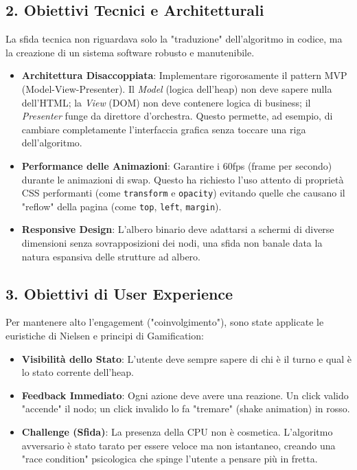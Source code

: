 \documentclass[openany]{theme/uniprthesis}
\begin{document}
\subsection{2. Obiettivi Tecnici e Architetturali}
La sfida tecnica non riguardava solo la "traduzione" dell'algoritmo in codice, ma la creazione di un sistema software robusto e manutenibile.
\begin{itemize}
    \item \textbf{Architettura Disaccoppiata}: Implementare rigorosamente il pattern MVP (Model-View-Presenter). Il \textit{Model} (logica dell'heap) non deve sapere nulla dell'HTML; la \textit{View} (DOM) non deve contenere logica di business; il \textit{Presenter} funge da direttore d'orchestra. Questo permette, ad esempio, di cambiare completamente l'interfaccia grafica senza toccare una riga dell'algoritmo.
    \item \textbf{Performance delle Animazioni}: Garantire i 60fps (frame per secondo) durante le animazioni di swap. Questo ha richiesto l'uso attento di proprietà CSS performanti (come \texttt{transform} e \texttt{opacity}) evitando quelle che causano il "reflow" della pagina (come \texttt{top}, \texttt{left}, \texttt{margin}).
    \item \textbf{Responsive Design}: L'albero binario deve adattarsi a schermi di diverse dimensioni senza sovrapposizioni dei nodi, una sfida non banale data la natura espansiva delle strutture ad albero.
\end{itemize}

\subsection{3. Obiettivi di User Experience}
Per mantenere alto l'engagement ("coinvolgimento"), sono state applicate le euristiche di Nielsen e principi di Gamification:
\begin{itemize}
    \item \textbf{Visibilità dello Stato}: L'utente deve sempre sapere di chi è il turno e qual è lo stato corrente dell'heap.
    \item \textbf{Feedback Immediato}: Ogni azione deve avere una reazione. Un click valido "accende" il nodo; un click invalido lo fa "tremare" (shake animation) in rosso.
    \item \textbf{Challenge (Sfida)}: La presenza della CPU non è cosmetica. L'algoritmo avversario è stato tarato per essere veloce ma non istantaneo, creando una "race condition" psicologica che spinge l'utente a pensare più in fretta.
\end{itemize}
\end{document}
